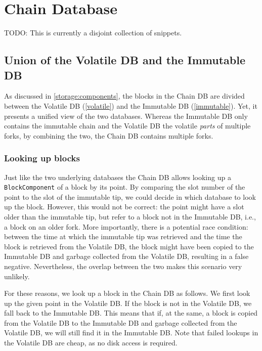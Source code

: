 \chapter{Chain Database}
\label{chaindb}

TODO: This is currently a disjoint collection of snippets.

\section{Union of the Volatile DB and the Immutable DB}
\label{chaindb:union}

As discussed in \cref{storage:components}, the blocks in the Chain DB are
divided between the Volatile DB (\cref{volatile}) and the Immutable DB
(\cref{immutable}). Yet, it presents a unified view of the two databases.
Whereas the Immutable DB only contains the immutable chain and the Volatile DB
the volatile \emph{parts} of multiple forks, by combining the two, the Chain DB
contains multiple forks.

\subsection{Looking up blocks}
\label{chaindb:union:lookup}

Just like the two underlying databases the Chain DB allows looking up a
\lstinline!BlockComponent! of a block by its point. By comparing the slot number
of the point to the slot of the immutable tip, we could decide in which database
to look up the block. However, this would not be correct: the point might have a
slot older than the immutable tip, but refer to a block not in the Immutable DB,
i.e., a block on an older fork. More importantly, there is a potential race
condition: between the time at which the immutable tip was retrieved and the
time the block is retrieved from the Volatile DB, the block might have been
copied to the Immutable DB and garbage collected from the Volatile DB, resulting
in a false negative. Nevertheless, the overlap between the two makes this
scenario very unlikely.

For these reasons, we look up a block in the Chain DB as follows. We first look
up the given point in the Volatile DB. If the block is not in the Volatile DB,
we fall back to the Immutable DB. This means that if, at the same, a block is
copied from the Volatile DB to the Immutable DB and garbage collected from the
Volatile DB, we will still find it in the Immutable DB. Note that failed lookups
in the Volatile DB are cheap, as no disk access is required.

